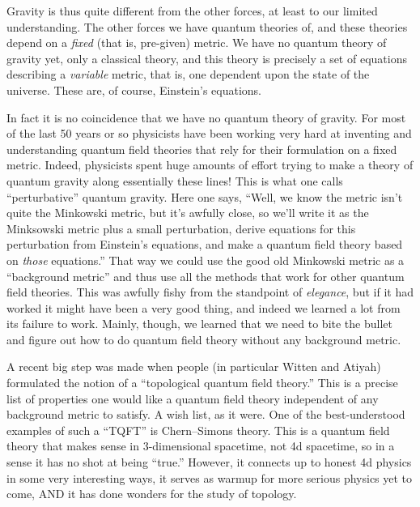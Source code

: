 \documentclass{article}
\begin{document}
Gravity is thus quite different from the other forces, at least to our
limited understanding. The other forces we have quantum theories of, and
these theories depend on a \emph{fixed} (that is, pre-given) metric. We
have no quantum theory of gravity yet, only a classical theory, and this
theory is precisely a set of equations describing a \emph{variable}
metric, that is, one dependent upon the state of the universe. These
are, of course, Einstein's equations.

In fact it is no coincidence that we have no quantum theory of gravity.
For most of the last 50 years or so physicists have been working very
hard at inventing and understanding quantum field theories that rely for
their formulation on a fixed metric. Indeed, physicists spent huge
amounts of effort trying to make a theory of quantum gravity along
essentially these lines! This is what one calls ``perturbative'' quantum
gravity. Here one says, ``Well, we know the metric isn't quite the
Minkowski metric, but it's awfully close, so we'll write it as the
Minksowski metric plus a small perturbation, derive equations for this
perturbation from Einstein's equations, and make a quantum field theory
based on \emph{those} equations.'' That way we could use the good old
Minkowski metric as a ``background metric'' and thus use all the methods
that work for other quantum field theories. This was awfully fishy from
the standpoint of \emph{elegance}, but if it had worked it might have
been a very good thing, and indeed we learned a lot from its failure to
work. Mainly, though, we learned that we need to bite the bullet and
figure out how to do quantum field theory without any background metric.

A recent big step was made when people (in particular Witten and Atiyah)
formulated the notion of a ``topological quantum field theory.'' This is
a precise list of properties one would like a quantum field theory
independent of any background metric to satisfy. A wish list, as it
were. One of the best-understood examples of such a ``TQFT'' is
Chern--Simons theory. This is a quantum field theory that makes sense in
3-dimensional spacetime, not 4d spacetime, so in a sense it has no shot
at being ``true.'' However, it connects up to honest 4d physics in some
very interesting ways, it serves as warmup for more serious physics yet
to come, AND it has done wonders for the study of topology.
\end{document}
